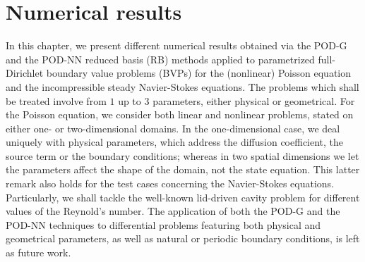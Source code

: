 \documentclass[12pt, a4paper, twoside, openright, notitlepage]{report}
\numberwithin{equation}{chapter}
\theoremstyle{theorem}
\theoremstyle{definition}
\theoremstyle{remark}
\theoremstyle{proposition}
\numberwithin{figure}{chapter}
\begin{document}
	
		
	\chapter{Numerical results}
	\label{chapter:Numerical results}
	
		In this chapter, we present different numerical results obtained via the POD-G and the POD-NN reduced basis (RB) methods applied to parametrized full-Dirichlet boundary value problems (BVPs) for the (nonlinear) Poisson equation and the incompressible steady Navier-Stokes equations. The problems which shall be treated involve from $1$ up to $3$ parameters, either physical or geometrical. For the Poisson equation, we consider both linear and nonlinear problems, stated on either one- or two-dimensional domains. In the one-dimensional case, we deal uniquely with physical parameters, which address the diffusion coefficient, the source term or the boundary conditions; whereas in two spatial dimensions we let the parameters affect the shape of the domain, not the state equation. This latter remark also holds for the test cases concerning the Navier-Stokes equations. Particularly, we shall tackle the well-known lid-driven cavity problem for different values of the Reynold's number. The application of both the POD-G and the POD-NN techniques to differential problems featuring both physical and geometrical parameters, as well as natural or periodic boundary conditions, is left as future work.
		
\end{document}
